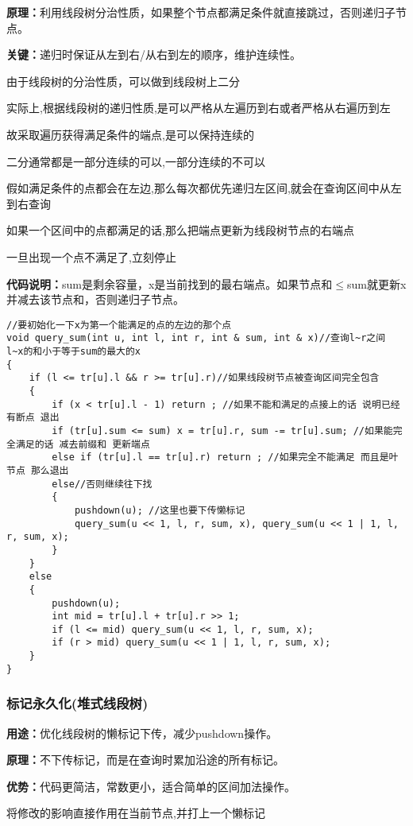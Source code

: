 \documentclass[a4paper,fontset=none]{ctexart}
\begin{document}
\textbf{原理：}利用线段树分治性质，如果整个节点都满足条件就直接跳过，否则递归子节点。

\textbf{关键：}递归时保证从左到右/从右到左的顺序，维护连续性。

由于线段树的分治性质，可以做到线段树上二分

实际上,根据线段树的递归性质,是可以严格从左遍历到右或者严格从右遍历到左

故采取遍历获得满足条件的端点,是可以保持连续的

二分通常都是一部分连续的可以,一部分连续的不可以 

假如满足条件的点都会在左边,那么每次都优先递归左区间,就会在查询区间中从左到右查询

如果一个区间中的点都满足的话,那么把端点更新为线段树节点的右端点

一旦出现一个点不满足了,立刻停止

\textbf{代码说明：}sum是剩余容量，x是当前找到的最右端点。如果节点和$\leq$sum就更新x并减去该节点和，否则递归子节点。
\begin{verbatim}
//要初始化一下x为第一个能满足的点的左边的那个点
void query_sum(int u, int l, int r, int & sum, int & x)//查询l~r之间 l~x的和小于等于sum的最大的x
{
    if (l <= tr[u].l && r >= tr[u].r)//如果线段树节点被查询区间完全包含
    {
        if (x < tr[u].l - 1) return ; //如果不能和满足的点接上的话 说明已经有断点 退出
        if (tr[u].sum <= sum) x = tr[u].r, sum -= tr[u].sum; //如果能完全满足的话 减去前缀和 更新端点
        else if (tr[u].l == tr[u].r) return ; //如果完全不能满足 而且是叶节点 那么退出
        else//否则继续往下找
        {
            pushdown(u); //这里也要下传懒标记
            query_sum(u << 1, l, r, sum, x), query_sum(u << 1 | 1, l, r, sum, x);
        }
    }
    else
    {
        pushdown(u);
        int mid = tr[u].l + tr[u].r >> 1;
        if (l <= mid) query_sum(u << 1, l, r, sum, x);
        if (r > mid) query_sum(u << 1 | 1, l, r, sum, x);
    }
}
\end{verbatim}
\subsubsection{标记永久化(堆式线段树)}
\textbf{用途：}优化线段树的懒标记下传，减少pushdown操作。

\textbf{原理：}不下传标记，而是在查询时累加沿途的所有标记。

\textbf{优势：}代码更简洁，常数更小，适合简单的区间加法操作。

将修改的影响直接作用在当前节点,并打上一个懒标记
\end{document}
